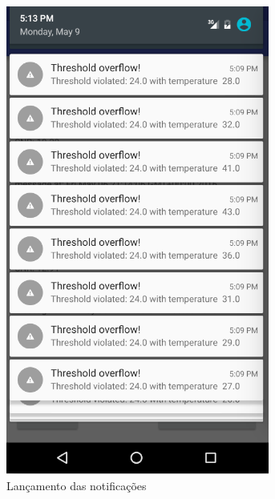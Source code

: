 \documentclass[a4paper]{article}
\begin{document}
\begin{figure}[H]
  \includegraphics[width=\linewidth]{alarmss.png}
  \caption{Lançamento das notificações}\label{fig:a}
\endminipage\hfill
{}

\end{figure}
\end{document}
